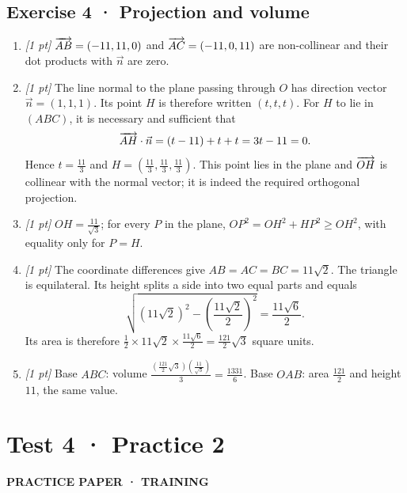 \subsection*{Exercise 4 · Projection and volume}\begin{enumerate}

\item \textit{[1 pt]} $\overrightarrow{AB}=(-11,11,0)$ and $\overrightarrow{AC}=(-11,0,11)$ are non-collinear and their dot products with $\vec n$ are zero.

\item \textit{[1 pt]} The line normal to the plane passing through $O$ has direction vector $\vec n=(1,1,1)$. Its point $H$ is therefore written $(t,t,t)$. For $H$ to lie in $(ABC)$, it is necessary and sufficient that
\[\overrightarrow{AH}\cdot\vec n=(t-11)+t+t=3t-11=0.\]
Hence $t=\frac{11}{3}$ and $H=(\frac{11}{3},\frac{11}{3},\frac{11}{3})$. This point lies in the plane and $\overrightarrow{OH}$ is collinear with the normal vector; it is indeed the required orthogonal projection.

\item \textit{[1 pt]} $OH=\frac{11}{\sqrt{3}}$; for every $P$ in the plane, $OP^2=OH^2+HP^2\ge OH^2$, with equality only for $P=H$.

\item \textit{[1 pt]} The coordinate differences give $AB=AC=BC=11\sqrt2$. The triangle is equilateral. Its height splits a side into two equal parts and equals
\[\sqrt{(11\sqrt2)^2-(\frac{11\sqrt{2}}{2})^2}=\frac{11\sqrt6}{2}.\]
Its area is therefore $\frac12\times 11\sqrt2\times\frac{11\sqrt6}{2}=\frac{121}{2}\sqrt3$ square units.

\item \textit{[1 pt]} Base $ABC$: volume $\frac{(\frac{121}{2}\sqrt3)(\frac{11}{\sqrt{3}})}{3}=\frac{1331}{6}$. Base $OAB$: area $\frac{121}{2}$ and height $11$, the same value.

\end{enumerate}

\fi

\clearpage{}\label{sujet:6-2}

\section*{Test 4 · Practice 2}

{\sffamily\bfseries\color{teal}PRACTICE PAPER · TRAINING\par}


